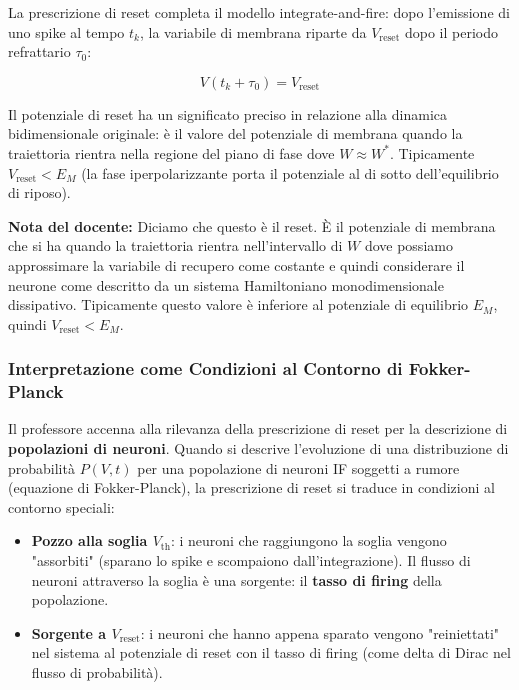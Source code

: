 La prescrizione di reset completa il modello integrate-and-fire: dopo l'emissione di uno spike al tempo $t_k$, la variabile di membrana riparte da $V_{\text{reset}}$ dopo il periodo refrattario $\tau_0$:

\begin{equation}
V(t_k + \tau_0) = V_{\text{reset}}
\end{equation}

Il potenziale di reset ha un significato preciso in relazione alla dinamica bidimensionale originale: è il valore del potenziale di membrana quando la traiettoria rientra nella regione del piano di fase dove $W \approx W^*$. Tipicamente $V_{\text{reset}} < E_M$ (la fase iperpolarizzante porta il potenziale al di sotto dell'equilibrio di riposo).

\begin{tcolorbox}[colback=gray!5, colframe=gray!40, arc=2mm, boxrule=0.5pt]
\textbf{Nota del docente:} Diciamo che questo è il reset. È il potenziale di membrana che si ha quando la traiettoria rientra nell'intervallo di $W$ dove possiamo approssimare la variabile di recupero come costante e quindi considerare il neurone come descritto da un sistema Hamiltoniano monodimensionale dissipativo. Tipicamente questo valore è inferiore al potenziale di equilibrio $E_M$, quindi $V_{\text{reset}} < E_M$.
\end{tcolorbox}

\subsubsection{Interpretazione come Condizioni al Contorno di Fokker-Planck}

Il professore accenna alla rilevanza della prescrizione di reset per la descrizione di \textbf{popolazioni di neuroni}. Quando si descrive l'evoluzione di una distribuzione di probabilità $P(V, t)$ per una popolazione di neuroni IF soggetti a rumore (equazione di Fokker-Planck), la prescrizione di reset si traduce in condizioni al contorno speciali:

\begin{itemize}
    \item \textbf{Pozzo alla soglia $V_{\text{th}}$}: i neuroni che raggiungono la soglia vengono "assorbiti" (sparano lo spike e scompaiono dall'integrazione). Il flusso di neuroni attraverso la soglia è una sorgente: il \textbf{tasso di firing} della popolazione.
    \item \textbf{Sorgente a $V_{\text{reset}}$}: i neuroni che hanno appena sparato vengono "reiniettati" nel sistema al potenziale di reset con il tasso di firing (come delta di Dirac nel flusso di probabilità).
\end{itemize}

